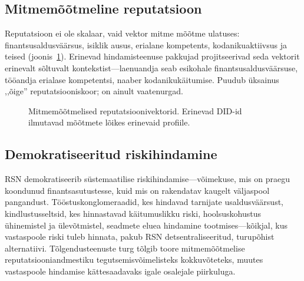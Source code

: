 \documentclass[11pt,a4paper,twocolumn]{article}
\begin{document}
\subsection{Mitmemõõtmeline reputatsioon}

Reputatsioon ei ole skalaar, vaid vektor mitme mõõtme ulatuses: finantsusaldusväärsus, isiklik ausus, erialane kompetents, kodanikuaktiivsus ja teised (joonis~\ref{fig:reputation-radar}). Erinevad hindamisteenuse pakkujad projitseerivad seda vektorit erinevalt sõltuvalt kontekstist---laenuandja seab esikohale finantsusaldusväärsuse, tööandja erialase kompetentsi, naaber kodanikukäitumise. Puudub üksainus ,,õige'' reputatsiooniskoor; on ainult vaatenurgad.

\begin{figure}[ht]
\centering
{}
\caption{Mitmemõõtmelised reputatsioonivektorid. Erinevad DID-id ilmutavad mõõtmete lõikes erinevaid profiile.}
\label{fig:reputation-radar}
\end{figure}

\subsection{Demokratiseeritud riskihindamine}

RSN demokratiseerib süstemaatilise riskihindamise---võimekuse, mis on praegu koondunud finantsasutustesse, kuid mis on rakendatav kaugelt väljaspool pangandust. Tööstuskonglomeraadid, kes hindavad tarnijate usaldusväärsust, kindlustusseltsid, kes hinnastavad käitumuslikku riski, hoolsuskohustus ühinemistel ja ülevõtmistel, seadmete eluea hindamine tootmises---kõikjal, kus vastaspoole riski tuleb hinnata, pakub RSN detsentraliseeritud, turupõhist alternatiivi. Tõlgendusteenuste turg tõlgib toore mitmemõõtmelise reputatsiooniandmestiku tegutsemisvõimelisteks kokkuvõteteks, muutes vastaspoole hindamise kättesaadavaks igale osalejale piirkuluga.
\end{document}

